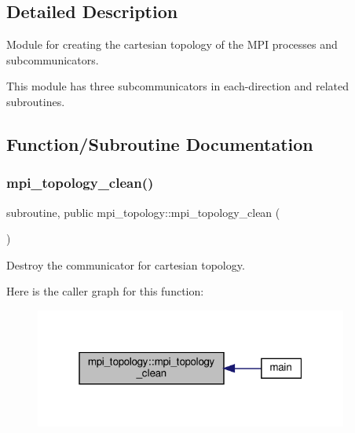 \subsection{Detailed Description}
Module for creating the cartesian topology of the M\+PI processes and subcommunicators. 

This module has three subcommunicators in each-\/direction and related subroutines. 

\subsection{Function/\+Subroutine Documentation}
\mbox{\label{namespacempi__topology_aa14e91baaec6d1c1082ebd5ac6e19128}} 
\subsubsection{\texorpdfstring{mpi\+\_\+topology\+\_\+clean()}{mpi\_topology\_clean()}}
{\footnotesize\ttfamily subroutine, public mpi\+\_\+topology\+::mpi\+\_\+topology\+\_\+clean (\begin{DoxyParamCaption}{ }\end{DoxyParamCaption})}



Destroy the communicator for cartesian topology. 

Here is the caller graph for this function\+:
\nopagebreak
\begin{figure}[H]
\begin{center}
\leavevmode
\includegraphics[width=292pt]{namespacempi__topology_aa14e91baaec6d1c1082ebd5ac6e19128_icgraph}
\end{center}
\end{figure}
\mbox{\label{namespacempi__topology_a8819f16f50aded913f17520a29d3ec4c}} 
